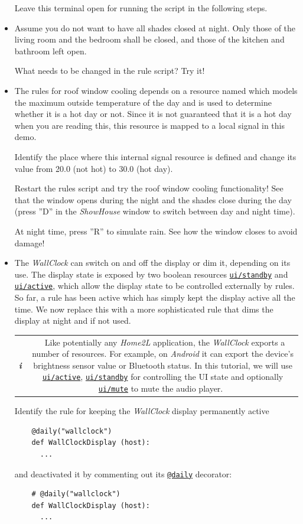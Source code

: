 \documentclass[12pt,english,parskip=half,headheight=19pt]{scrreprt}
\newcommand{\lst}[1]{\colorbox{lstbackground}{\footnotesize\code{#1}}}
\newcommand{\infobox}[1]{
  \par
  \medskip
  \hfill
  \setlength\arrayrulewidth{1pt}
  \begin{tabular}[t]{c|c|}
    \parbox{1.8em}{\hfill\textit{\Huge\textbf{i}\,}}
    &
    \,\parbox{0.89\linewidth}{\setlength{\parskip}{0.5em} \small #1}\,
  \end{tabular}
  \medskip
  \par
}
\newcommand{\refrc}[1]{\hyperref[rc:#1]{\texttt{#1}}}
\newcommand{\refapipython}[1]{\href{home2l-api_python/index.html}{\mbox{\texttt{#1}}}}  %
\begin{document}
\begin{itemize}[$\blacktriangleright$]
  Leave this terminal open for running the script in the following steps.

\item
  Assume you do not want to have all shades closed at night. Only those of the living room
  and the bedroom shall be closed, and those of the kitchen and bathroom left open.

  What needs to be changed in the rule script? Try it!

\item
  The rules for roof window cooling depends on a resource named \lst{rcTempDayMaxOutside}
  which models the maximum outside temperature of the day and is used to determine whether
  it is a hot day or not. Since it is not guaranteed that it is a hot day when you are reading
  this, this resource is mapped to a local signal in this demo.

  Identify the place where this internal signal resource is defined and change its value from
  20.0 (not hot) to 30.0 (hot day).

  Restart the rules script and try the roof window cooling functionality!
  See that the window opens during the night and the shades close during the day
  (press ''D'' in the \textit{ShowHouse} window to switch between day and night time).

  At night time, press ''R'' to simulate rain. See how the window closes to avoid damage!

\item
  The \textit{WallClock} can switch on and off the display or dim it, depending on its use. The display state
  is exposed by two boolean resources \refrc{ui/standby} and \refrc{ui/active}, which allow the display state to
  be controlled externally by rules. So far, a rule has been active which has simply kept the display active all the
  time. We now replace this with a more sophisticated rule that dims the display at night and if not used.

  \infobox{
    Like potentially any \textit{Home2L} application, the \textit{WallClock}
    exports a number of resources. For example, on \textit{Android} it can export
    the device's brightness sensor value or Bluetooth status. In this tutorial, we will use
    \refrc{ui/active}, \refrc{ui/standby} for controlling the UI state and optionally
    \refrc{ui/mute} to mute the audio player.
  }

  Identify the rule for keeping the \textit{WallClock} display permanently active
  \begin{lstlisting}
    @daily("wallclock")
    def WallClockDisplay (host):
      ...
  \end{lstlisting}
  and deactivated it by commenting out its \refapipython{@daily} decorator:
  \begin{lstlisting}
    # @daily("wallclock")
    def WallClockDisplay (host):
      ...
  \end{lstlisting}


\end{itemize}
\end{document}
